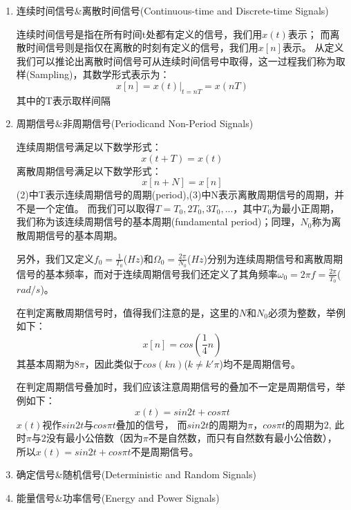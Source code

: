 \documentclass[UTF8]{article}
\begin{document}
\begin{enumerate}
    \item 连续时间信号\&离散时间信号(Continuous-time and Discrete-time Signals)
    
    连续时间信号是指在所有时间t处都有定义的信号，我们用$x(t)$表示；
    而离散时间信号则是指仅在离散的时刻有定义的信号，我们用$x[n]$表示。
    从定义我们可以推论出离散时间信号可从连续时间信号中取得，这一过程我们称为{\heiti 取样}(Sampling)，其数学形式表示为：
    \begin{equation}
        x[n]= \left.x(t)\right|_{t=nT} =x(nT)
    \end{equation}其中的T表示取样间隔

    \item 周期信号\&非周期信号(Periodicand Non-Period Signals)
    
    连续周期信号满足以下数学形式：
    \begin{equation}
        x(t+T)=x(t)
    \end{equation}
    离散周期信号满足以下数学形式：
    \begin{equation}
        x[n+N]=x[n]
    \end{equation}
    (2)中T表示连续周期信号的周期(period),(3)中N表示离散周期信号的周期，并不是一个定值。
    而我们可以取得$T=T_{0},2T_{0},3T_{0},...$，其中$T_{0}$为最小正周期，我们称为该连续周期信号的基本周期(fundamental period)；同理，$N_{0}$称为离散周期信号的基本周期。
    
    另外，我们又定义{\heiti $f_{0}=\frac{1}{T_{0}}$($Hz$)}和{\heiti $\Omega_{0}=\frac{2\pi}{N_{0}}$($Hz$)}分别为连续周期信号和离散周期信号的基本频率，而对于连续周期信号我们还定义了其角频率{\heiti $\omega_{0}=2\pi f=\frac{2\pi}{T_{0}}$($rad/s$)}。

    在判定离散周期信号时，值得我们注意的是，{\heiti 这里的$N$和$N_{0}$必须为整数}，举例如下：
    $$x[n]=cos(\frac{1}{4}n)$$
    其基本周期为$8\pi$，因此类似于$cos(kn)$($k\neq {k}'\pi$)均不是周期信号。

    在判定周期信号叠加时，我们应该注意{\heiti 周期信号的叠加不一定是周期信号}，举例如下：
    $$x(t)=sin2t+cos\pi t$$
    $x(t)$视作$sin2t$与$cos \pi t$叠加的信号，
    而$sin2t$的周期为$\pi$，$cos \pi t$的周期为$2$,
    此时$\pi$与$2$没有最小公倍数（因为$\pi$不是自然数，而只有自然数有最小公倍数），
    所以$x(t)=sin2t+cos\pi t$不是周期信号。
    
    \item 确定信号\&随机信号(Deterministic and Random Signals)
    
    \item 能量信号\&功率信号(Energy and Power Signals)
    

\end{enumerate}
\end{document}
